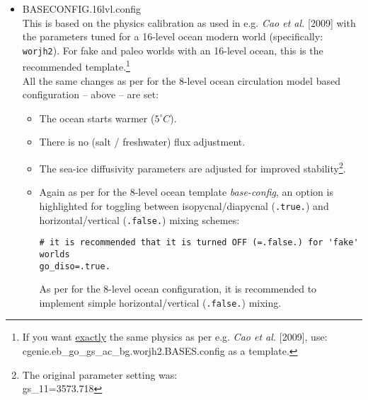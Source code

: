 \documentclass[11pt,fleqn]{book} %
\begin{document}
\begin{itemize}[noitemsep]
\pagebreak
\vspace{1mm}
\item \textsf{\small BASECONFIG.16lvl.config}
\vspace{1mm}
\\This is based on the physics calibration as used in e.g. \textit{Cao et al.} [2009] with the parameters tuned for a 16-level ocean modern world (specifically: \texttt{worjh2}). For fake and paleo worlds with an 16-level ocean, this is the recommended template.\footnote{If you want \uline{exactly} the same physics as per e.g. \textit{Cao et al.} [2009], use: \linebreak\textsf{\footnotesize cgenie.eb\_go\_gs\_ac\_bg.worjh2.BASES.config} as a template.}
\\All the same changes as per for the 8-level ocean circulation model based configuration -- above -- are set:
\begin{itemize}[noitemsep]
\vspace{1mm}
\item The ocean starts warmer (\(5^{\circ}C\)).
\vspace{1mm}
\item There is no (salt / freshwater) flux adjustment.
\vspace{1mm}
\item The sea-ice diffusivity parameters are adjusted for improved stability\footnote{The original parameter setting was:
\\gs\_11=3573.718}.
\end{itemize}
\vspace{1mm}

\begin{itemize}[noitemsep]
\vspace{1mm}
\item
Again as per for the 8-level ocean template \textit{base-config}, an option is highlighted for toggling between isopycnal/diapycnal (\texttt{.true.}) and horizontal/vertical (\texttt{.false.}) mixing schemes:
\small\vspace{-2pt}\begin{verbatim}
# it is recommended that it is turned OFF (=.false.) for 'fake' worlds
go_diso=.true.
\end{verbatim}\vspace{-2pt}\normalsize
As per for the 8-level ocean configuration, it is recommended to implement simple horizontal/vertical (\texttt{.false.}) mixing.
\end{itemize}


\end{itemize}
\end{document}
